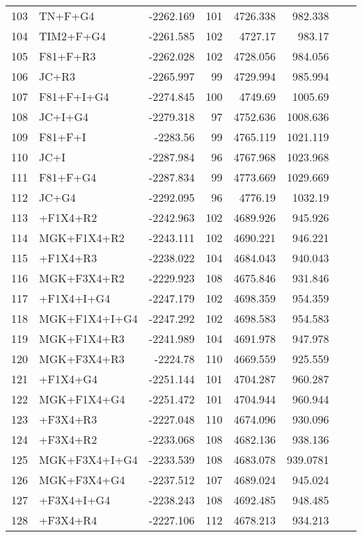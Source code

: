 \begin{longtable}{clrrrrrr}
	103 & TN+F+G4 & -2262.169 & 101 & 4726.338 & 982.338 \\ 
	104 & TIM2+F+G4 & -2261.585 & 102 & 4727.17 & 983.17 \\ 
	105 & F81+F+R3 & -2262.028 & 102 & 4728.056 & 984.056 \\ 
	106 & JC+R3 & -2265.997 & 99 & 4729.994 & 985.994 \\ 
	107 & F81+F+I+G4 & -2274.845 & 100 & 4749.69 & 1005.69 \\ 
	108 & JC+I+G4 & -2279.318 & 97 & 4752.636 & 1008.636 \\ 
	109 & F81+F+I & -2283.56 & 99 & 4765.119 & 1021.119 \\ 
	110 & JC+I & -2287.984 & 96 & 4767.968 & 1023.968 \\ 
	111 & F81+F+G4 & -2287.834 & 99 & 4773.669 & 1029.669 \\ 
	112 & JC+G4 & -2292.095 & 96 & 4776.19 & 1032.19 \\ 
	113 & \gy+F1X4+R2 & -2242.963 & 102 & 4689.926 & 945.926 \\ 
	114 & MGK+F1X4+R2 & -2243.111 & 102 & 4690.221 & 946.221 \\ 
	115 & \gy+F1X4+R3 & -2238.022 & 104 & 4684.043 & 940.043 \\ 
	116 & MGK+F3X4+R2 & -2229.923 & 108 & 4675.846 & 931.846 \\ 
	117 & \gy+F1X4+I+G4 & -2247.179 & 102 & 4698.359 & 954.359 \\ 
	118 & MGK+F1X4+I+G4 & -2247.292 & 102 & 4698.583 & 954.583 \\ 
	119 & MGK+F1X4+R3 & -2241.989 & 104 & 4691.978 & 947.978 \\ 
	120 & MGK+F3X4+R3 & -2224.78 & 110 & 4669.559 & 925.559 \\ 
	121 & \gy+F1X4+G4 & -2251.144 & 101 & 4704.287 & 960.287 \\ 
	122 & MGK+F1X4+G4 & -2251.472 & 101 & 4704.944 & 960.944 \\ 
	123 & \gy+F3X4+R3 & -2227.048 & 110 & 4674.096 & 930.096 \\ 
	124 & \gy+F3X4+R2 & -2233.068 & 108 & 4682.136 & 938.136 \\ 
	125 & MGK+F3X4+I+G4 & -2233.539 & 108 & 4683.078 & 939.0781 \\ 
	126 & MGK+F3X4+G4 & -2237.512 & 107 & 4689.024 & 945.024 \\ 
	127 & \gy+F3X4+I+G4 & -2238.243 & 108 & 4692.485 & 948.485 \\ 
	128 & \gy+F3X4+R4 & -2227.106 & 112 & 4678.213 & 934.213 \\ 

\end{longtable}
